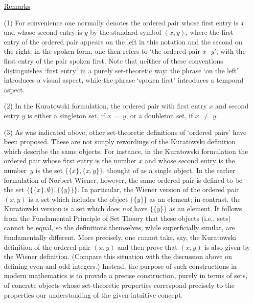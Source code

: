 \V

        \underline{Remarks}

\V

        (1) For convenience one normally denotes the ordered pair whose first entry is $x$ and whose second entry is $y$ by the standard symbol $(x,y)$,
    where the first entry of the ordered pair appears on the left in this notation and the second on the right;
    in the spoken form, one then refers to `the ordered pair $x$\,~$y$', with the first entry of the pair spoken first.
    Note that neither of these conventions distinguishes `first entry' in a purely set-theoretic way:
    the phrase `on the left' introduces a visual aspect, while the phrase `spoken first' introduces a temporal aspect.

\V

        (2) In the Kuratowski formulation, the ordered pair with first entry $x$ and second entry $y$ is either a singleton set, if $x \,=\, y$, or a doubleton set, if $x \,\,{\neq}\,\, y$.

\V

        (3) As was indicated above, other set-theoretic definitions of `ordered pairs' have been proposed.
    These are not simply rewordings of the Kuratowski definition which describe the same objects.
    For instance, in the Kuratowski formulation the ordered pair whose first entry is the number $x$
    and whose second entry is the number~$y$ is the set $\{\{x\}, \{x,y\}\}$, thought of as a single object.
    In the earlier formulation of Norbert Wiener, however, the same ordered pair is defined to be the set $\{\{\{x\},{\emptyset}\}, \{\{y\}\}\}$.
    In particular, the Wiener version of the ordered pair $(x,y)$ is a set which includes the object $\{\{y\}\}$ as an element;
    in contrast, the Kuratowski version is a set which does {\em not} have $\{\{y\}\}$ as an element.
    It follows from the Fundamental Principle of Set Theory that these objects (i.e., sets) cannot be equal,
    so the definitions themselves, while superficially similar, are fundamentally different.
    More precisely, one cannot take, say, the Kuratowski definition of the ordered pair $(x,y)$
    and then prove that $(x,y)$ is also given by the Wiener definition.
    (Compare this situation with the discussion above on defining even and odd integers.)
    Instead, the purpose of such constructions in modern mathematics is to provide a precise construction, purely in terms of sets,
    of concrete objects whose set-theoretic properties correspond precisely to the properties our understanding of the given intuitive concept.

